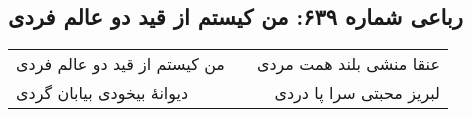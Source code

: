 \begin{center}
\section*{رباعی شماره ۶۳۹: من کیستم از قید دو عالم فردی}
\label{sec:sh639}
\begin{longtable}{l p{0.5cm} r}
من کیستم از قید دو عالم فردی
&&
عنقا منشی بلند همت مردی
\\
دیوانهٔ بیخودی بیابان گردی
&&
لبریز محبتی سرا پا دردی
\\
\end{longtable}
\end{center}
